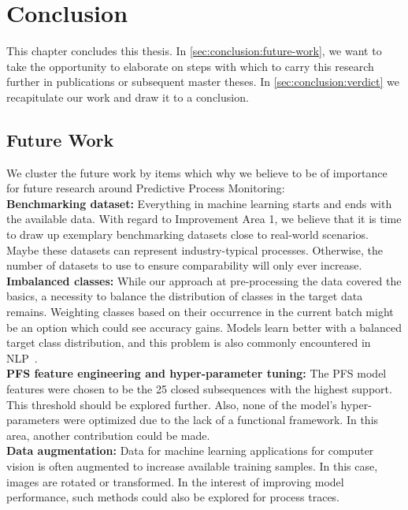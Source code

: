\chapter{Conclusion} \label{chap:conclusion}
This chapter concludes this thesis. In \autoref{sec:conclusion:future-work}, we want to take the opportunity to elaborate on steps with which to carry this research further in publications or subsequent master theses. In \autoref{sec:conclusion:verdict} we recapitulate our work and draw it to a conclusion.

\section{Future Work} \label{sec:conclusion:future-work}
We cluster the future work by items which why we believe to be of importance for future research around Predictive Process Monitoring:\\

\noindent\textbf{Benchmarking dataset:} Everything in machine learning starts and ends with the available data. With regard to Improvement Area 1, we believe that it is time to draw up exemplary benchmarking datasets close to real-world scenarios. Maybe these datasets can represent industry-typical processes. Otherwise, the number of datasets to use to ensure comparability will only ever increase.\\

\noindent\textbf{Imbalanced classes:} While our approach at pre-processing the data covered the basics, a necessity to balance the distribution of classes in the target data remains. Weighting classes based on their occurrence in the current batch might be an option which could see accuracy gains. Models learn better with a balanced target class distribution, and this problem is also commonly encountered in NLP~\cite{web:stackoverflow-keras-class-weights}.\\

\noindent\textbf{PFS feature engineering and hyper-parameter tuning:} The PFS model features were chosen to be the 25 closed subsequences with the highest support. This threshold should be explored further. Also, none of the model's hyper-parameters were optimized due to the lack of a functional framework. In this area, another contribution could be made.\\

\noindent\textbf{Data augmentation:} Data for machine learning applications for computer vision is often augmented to increase available training samples. In this case, images are rotated or transformed. In the interest of improving model performance, such methods could also be explored for process traces.\\

